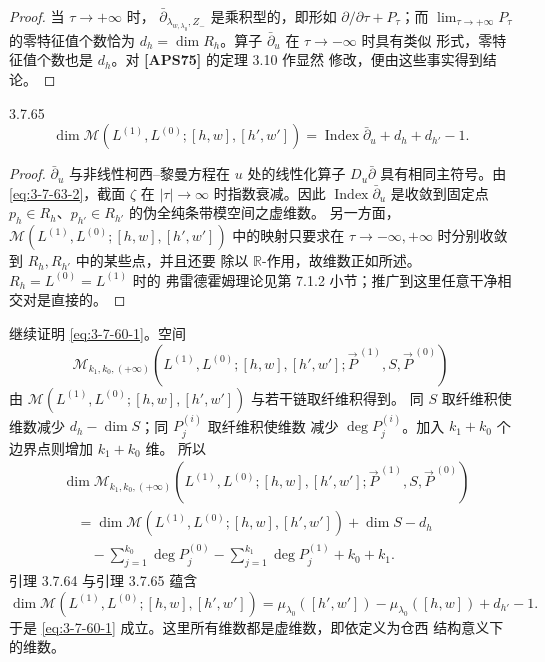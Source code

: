 \begin{proof}
当 $\tau\to+\infty$ 时，
$\bar\partial_{\lambda_{w,\lambda_0},Z_-}$ 是乘积型的，即形如
$\partial/\partial\tau+P_\tau$；而
$\lim_{\tau\to+\infty}P_\tau$ 的零特征值个数恰为
$d_h=\dim R_h$。算子 $\bar\partial_u$ 在 $\tau\to-\infty$ 时具有类似
形式，零特征值个数也是 $d_h$。对 \textbf{[APS75]} 的定理 3.10 作显然
修改，便由这些事实得到结论。
\end{proof}

\begin{lemma}{3.7.65}\label{lem:3-7-65}
\[
 \dim\mathcal M(L^{(1)},L^{(0)};[h,w],[h',w'])
 =
 \operatorname{Index}\bar\partial_u+d_h+d_{h'}-1.
\]
\end{lemma}

\begin{proof}
$\bar\partial_u$ 与非线性柯西--黎曼方程在 $u$ 处的线性化算子
$D_u\bar\partial$ 具有相同主符号。由 \eqref{eq:3-7-63-2}，截面 $\zeta$
在 $|\tau|\to\infty$ 时指数衰减。因此
$\operatorname{Index}\bar\partial_u$ 是收敛到固定点
$p_h\in R_h$、$p_{h'}\in R_{h'}$ 的伪全纯条带模空间之虚维数。
另一方面，$\mathcal M(L^{(1)},L^{(0)};[h,w],[h',w'])$ 中的映射只要求在
$\tau\to-\infty,+\infty$ 时分别收敛到 $R_h,R_{h'}$ 中的某些点，并且还要
除以 $\mathbb R$-作用，故维数正如所述。$R_h=L^{(0)}=L^{(1)}$ 时的
弗雷德霍姆理论见第 7.1.2 小节；推广到这里任意干净相交对是直接的。
\end{proof}

继续证明 \eqref{eq:3-7-60-1}。空间
\[
 \mathcal M_{k_1,k_0,(+\infty)}
 (L^{(1)},L^{(0)};[h,w],[h',w'];
 \vec P^{\,(1)},S,\vec P^{\,(0)})
\]
由 $\mathcal M(L^{(1)},L^{(0)};[h,w],[h',w'])$ 与若干链取纤维积得到。
同 $S$ 取纤维积使维数减少 $d_h-\dim S$；同 $P_j^{(i)}$ 取纤维积使维数
减少 $\deg P_j^{(i)}$。加入 $k_1+k_0$ 个边界点则增加 $k_1+k_0$ 维。
所以
\[
\begin{aligned}
 &\dim\mathcal M_{k_1,k_0,(+\infty)}
 (L^{(1)},L^{(0)};[h,w],[h',w'];
 \vec P^{\,(1)},S,\vec P^{\,(0)})\\
 &\quad=
 \dim\mathcal M(L^{(1)},L^{(0)};[h,w],[h',w'])
 +\dim S-d_h\\
 &\qquad
 -\sum_{j=1}^{k_0}\deg P_j^{(0)}
 -\sum_{j=1}^{k_1}\deg P_j^{(1)}
 +k_0+k_1.
\end{aligned}
\]
引理 3.7.64 与引理 3.7.65 蕴含
\[
 \dim\mathcal M(L^{(1)},L^{(0)};[h,w],[h',w'])
 =
 \mu_{\lambda_0}([h',w'])-\mu_{\lambda_0}([h,w])+d_{h'}-1.
\]
于是 \eqref{eq:3-7-60-1} 成立。这里所有维数都是虚维数，即依定义为仓西
结构意义下的维数。

